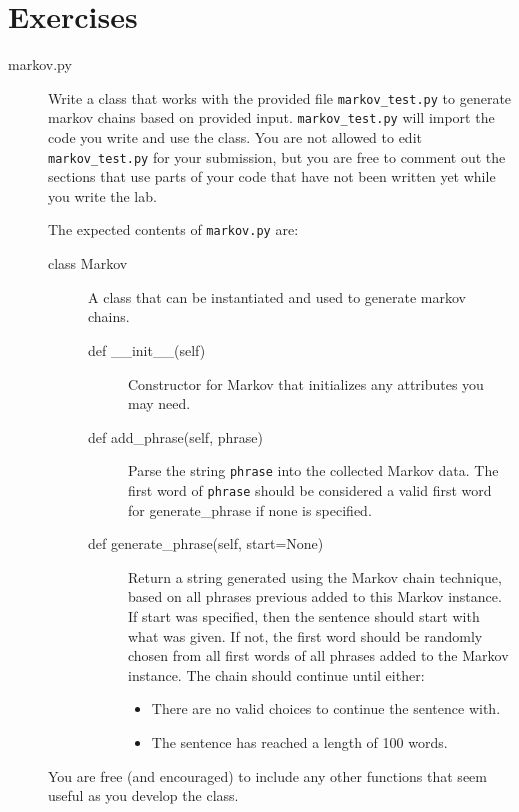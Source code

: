 \documentclass[11pt]{cselabheader}
\begin{document}
\clearpage
\section{Exercises}
\label{sec:ex}
\begin{description}
\item[markov.py] Write a class that works with the provided file
  \lstinline{markov_test.py} to generate markov chains based on provided
  input. \lstinline{markov_test.py} will import the code you write and
  use the class. You are not allowed to edit \lstinline{markov_test.py}
  for your submission, but you are free to comment out the sections
  that use parts of your code that have not been written yet while
  you write the lab.
  
  The expected contents of \lstinline{markov.py} are:
  
  \begin{description}
  \item[class Markov] A class that can be instantiated and used to
    generate markov chains.
    \begin{description}
    \item[def \_\_init\_\_(self)] Constructor for Markov that
      initializes any attributes you may need.
    \item[def add\_phrase(self, phrase)] Parse the string
      \lstinline!phrase! into the collected Markov data. The
      first word of \lstinline!phrase! should be considered a
      valid first word for generate\_phrase if none is specified.
    \item[def generate\_phrase(self, start=None)] Return a string
      generated using the Markov chain technique, based on all phrases
      previous added to this Markov instance. If start was specified,
      then the sentence should start with what was given. If not, the
      first word should be randomly chosen from all first words of all
      phrases added to the Markov instance. The chain should continue
      until either:
      \begin{itemize}
      \item There are no valid choices to continue the sentence with.
      \item The sentence has reached a length of 100 words.
      \end{itemize}
    \end{description}
  \end{description}
  
  You are free (and encouraged) to include any other functions that
  seem useful as you develop the class.
  

\end{description}
\end{document}
